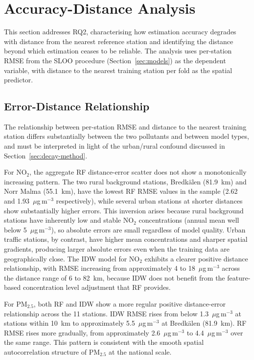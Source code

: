 \documentclass[11pt,a4paper]{article}
\let\oldsection\section
\renewcommand{\section}{\FloatBarrier\oldsection}
\let\oldsubsection\subsection
\renewcommand{\subsection}{\FloatBarrier\oldsubsection}
\begin{document}
\section{Accuracy-Distance Analysis}
\label{sec:decay}

This section addresses RQ2, characterising how estimation accuracy degrades with distance from the nearest reference station and identifying the distance beyond which estimation ceases to be reliable. The analysis uses per-station RMSE from the SLOO procedure (Section~\ref{sec:models}) as the dependent variable, with distance to the nearest training station per fold as the spatial predictor.

\subsection{Error-Distance Relationship}
\label{sec:decay-scatter}

The relationship between per-station RMSE and distance to the nearest training station differs substantially between the two pollutants and between model types, and must be interpreted in light of the urban/rural confound discussed in Section~\ref{sec:decay-method}.

For NO$_2$, the aggregate RF distance-error scatter does not show a monotonically increasing pattern. The two rural background stations, Bredkälen (81.9~km) and Norr Malma (55.1~km), have the lowest RF RMSE values in the sample (2.62 and 1.93~$\mu$g\,m$^{-3}$ respectively), while several urban stations at shorter distances show substantially higher errors. This inversion arises because rural background stations have inherently low and stable NO$_2$ concentrations (annual mean well below 5~$\mu$g\,m$^{-3}$), so absolute errors are small regardless of model quality. Urban traffic stations, by contrast, have higher mean concentrations and sharper spatial gradients, producing larger absolute errors even when the training data are geographically close. The IDW model for NO$_2$ exhibits a clearer positive distance relationship, with RMSE increasing from approximately 4 to 18~$\mu$g\,m$^{-3}$ across the distance range of 6 to 82~km, because IDW does not benefit from the feature-based concentration level adjustment that RF provides.

For PM$_{2.5}$, both RF and IDW show a more regular positive distance-error relationship across the 11 stations. IDW RMSE rises from below 1.3~$\mu$g\,m$^{-3}$ at stations within 10~km to approximately 5.5~$\mu$g\,m$^{-3}$ at Bredkälen (81.9~km). RF RMSE rises more gradually, from approximately 2.6~$\mu$g\,m$^{-3}$ to 4.4~$\mu$g\,m$^{-3}$ over the same range. This pattern is consistent with the smooth spatial autocorrelation structure of PM$_{2.5}$ at the national scale.
\end{document}
